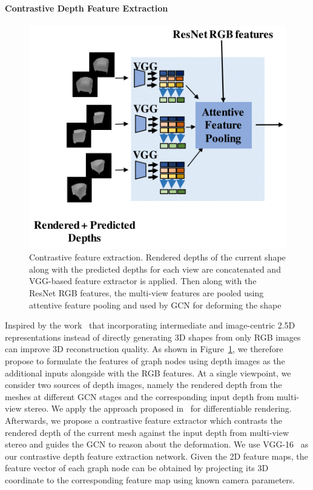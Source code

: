 \label{subsec:contrastive_depth_feature_extraction}
\paragraph{Contrastive Depth Feature Extraction}\vspace{-4mm}
\begin{figure}[th!]
    \begin{center}
        \includegraphics[width=0.8\linewidth]{imgs/contrastive_feature_extractor.png}
    \end{center}
        \caption{Contrastive feature extraction. Rendered depths of the current shape along with the predicted depths for each view are concatenated and VGG-based feature extractor is applied. Then along with the ResNet RGB features, the multi-view features are pooled using attentive feature pooling and used by GCN for deforming the shape}
        \label{fig:contrastive_feature_extractor}
\end{figure}

Inspired by the work~\cite{yao2020front2back} that incorporating intermediate and image-centric 2.5D representations instead of directly generating 3D shapes from only RGB images~\cite{wang2018pixel2mesh,wen2019pixel2mesh++} can improve 3D reconstruction quality.
As shown in Figure~\ref{fig:contrastive_feature_extractor}, we therefore propose to formulate the features of graph nodes using depth images as the additional inputs alongside with the RGB features.
At a single viewpoint, we consider two sources of depth images, namely the rendered depth from the meshes at different GCN stages and the corresponding input depth from multi-view stereo.
We apply the approach proposed in~\cite{kato2018renderer} for differentiable rendering.
Afterwards, we propose a contrastive feature extractor which contrasts the rendered depth of the current mesh against the input depth from multi-view stereo and guides the GCN to reason about the deformation.
We use VGG-16~\cite{simonyan2014vgg} as our contrastive depth feature extraction network.
Given the 2D feature maps, the feature vector of each graph node can be obtained by projecting its 3D coordinate to the corresponding feature map using known camera parameters.

